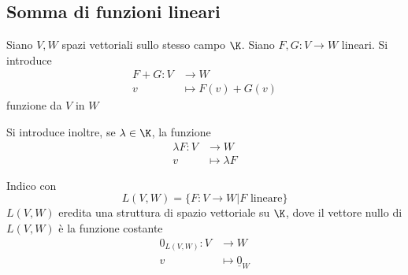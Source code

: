 


\subsection{Somma di funzioni lineari}

Siano $ V, W $ spazi vettoriali sullo stesso campo $ \K $. Siano $ F, G: V\to W $ lineari. Si introduce \begin{align*}
F+G: V & \to  W \\
 v & \mapsto F(v)+G(v)
\end{align*}
funzione da $ V $ in $ W $


Si introduce inoltre, se $ \lambda \in \K $, la funzione \begin{align*}
\lambda F:V & \to W \\
v & \mapsto \lambda F
\end{align*}


Indico con \[
    L(V, W)=\{F:V\to W | F \text{ lineare}\}
\]
$ L(V,W) $ eredita una struttura di spazio vettoriale su $ \K $, dove il vettore nullo di $ L(V,W) $ è la funzione costante \begin{align*}
0_{L(V,W)}: V & \to W \\
v & \mapsto \underline{0}_W
\end{align*}